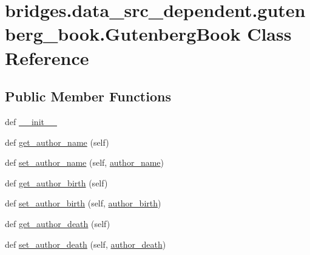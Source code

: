\hypertarget{classbridges_1_1data__src__dependent_1_1gutenberg__book_1_1_gutenberg_book}{}\section{bridges.\+data\+\_\+src\+\_\+dependent.\+gutenberg\+\_\+book.\+Gutenberg\+Book Class Reference}
\label{classbridges_1_1data__src__dependent_1_1gutenberg__book_1_1_gutenberg_book}
\subsection*{Public Member Functions}
\begin{DoxyCompactItemize}
\item 
def \mbox{\hyperlink{classbridges_1_1data__src__dependent_1_1gutenberg__book_1_1_gutenberg_book_ac44f922d6f63fc6ab3c0788ea9b9c4b5}{\+\_\+\+\_\+init\+\_\+\+\_\+}}
\item 
def \mbox{\hyperlink{classbridges_1_1data__src__dependent_1_1gutenberg__book_1_1_gutenberg_book_ac5b6db7fb268afcae5380c2fc64b5db7}{get\+\_\+author\+\_\+name}} (self)
\item 
def \mbox{\hyperlink{classbridges_1_1data__src__dependent_1_1gutenberg__book_1_1_gutenberg_book_abdaaa04d59c9fe20932ec1a83b4fac61}{set\+\_\+author\+\_\+name}} (self, \mbox{\hyperlink{classbridges_1_1data__src__dependent_1_1gutenberg__book_1_1_gutenberg_book_a3a3ad89776fa71b645cdf37edfdb63a4}{author\+\_\+name}})
\item 
def \mbox{\hyperlink{classbridges_1_1data__src__dependent_1_1gutenberg__book_1_1_gutenberg_book_af2044cfc437344ea2c3a29e3dfc0840e}{get\+\_\+author\+\_\+birth}} (self)
\item 
def \mbox{\hyperlink{classbridges_1_1data__src__dependent_1_1gutenberg__book_1_1_gutenberg_book_ae52c6344f9d592daa69a979158976427}{set\+\_\+author\+\_\+birth}} (self, \mbox{\hyperlink{classbridges_1_1data__src__dependent_1_1gutenberg__book_1_1_gutenberg_book_a336e238d267ef63999138db2ebf60563}{author\+\_\+birth}})
\item 
def \mbox{\hyperlink{classbridges_1_1data__src__dependent_1_1gutenberg__book_1_1_gutenberg_book_afa1f7e5cbe90176bee2a04bbd6eb2ae3}{get\+\_\+author\+\_\+death}} (self)
\item 
def \mbox{\hyperlink{classbridges_1_1data__src__dependent_1_1gutenberg__book_1_1_gutenberg_book_ab25d7ec419515f558b4802dea14d9451}{set\+\_\+author\+\_\+death}} (self, \mbox{\hyperlink{classbridges_1_1data__src__dependent_1_1gutenberg__book_1_1_gutenberg_book_afd78a02948accf9b270e7b9cb9e38856}{author\+\_\+death}})

\end{DoxyCompactItemize}
